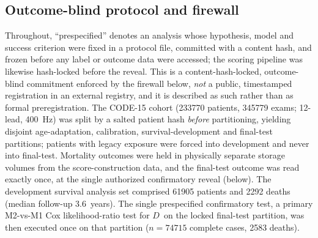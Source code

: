 \documentclass[11pt]{article}
\newcommand{\D}{\ensuremath{D}}
\begin{document}
\subsection{Outcome-blind protocol and firewall}
Throughout, ``prespecified'' denotes an analysis whose hypothesis, model and success
criterion were fixed in a protocol file, committed with a content hash, and frozen
before any label or outcome data were accessed; the scoring pipeline was likewise
hash-locked before the reveal. This is a content-hash-locked, outcome-blind commitment
enforced by the firewall below, \emph{not} a public, timestamped registration in an
external registry, and it is described as such rather than as formal preregistration.
The CODE-15 cohort (\num{233770} patients, \num{345779} exams; 12-lead, \SI{400}{\hertz})
was split by a salted patient hash \emph{before} partitioning, yielding disjoint
age-adaptation, calibration, survival-development and final-test partitions; patients
with legacy exposure were forced into development and never into final-test. Mortality
outcomes were held in physically separate storage volumes from the score-construction
data, and the final-test outcome was read exactly once, at the single authorized
confirmatory reveal (below). The development survival analysis set comprised
\num{61905} patients and \num{2292} deaths (median follow-up \num{3.6}~years). The single
prespecified confirmatory test, a primary M2-vs-M1 Cox likelihood-ratio test for \D\
on the locked final-test partition, was then executed once on that partition
($n=\num{74715}$ complete cases, \num{2583} deaths).
\end{document}
